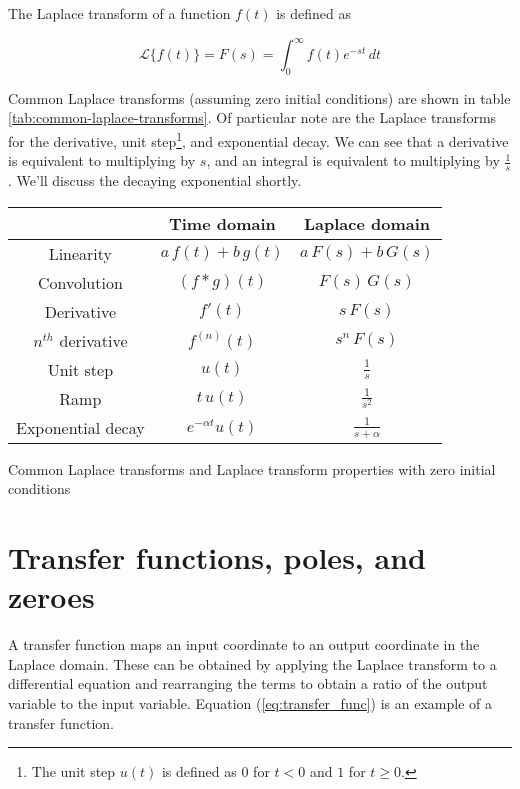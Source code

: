 The Laplace transform of a function $f(t)$ is defined as

\begin{equation*}
  \mathcal{L}\{f(t)\} = F(s) = \int_0^\infty f(t) e^{-st} \,dt
\end{equation*}

Common Laplace transforms (assuming zero initial conditions) are shown in table
\ref{tab:common-laplace-transforms}. Of particular note are the Laplace
transforms for the derivative, unit step\footnote{The unit step $u(t)$ is
defined as $0$ for $t < 0$ and $1$ for $t \ge 0$.}, and exponential decay. We
can see that a derivative is equivalent to multiplying by $s$, and an integral
is equivalent to multiplying by $\frac{1}{s}$. We'll discuss the decaying
exponential shortly.

\begin{booktable}
  \begin{tabular}{|ccc|}
    \hline
    \rowcolor{headingbg}
    & \textbf{Time domain} & \textbf{Laplace domain} \\
    \hline
    Linearity & $a\,f(t) + b\,g(t)$ & $a\,F(s) + b\,G(s)$ \\
    Convolution & $(f * g)(t)$ & $F(s) \,G(s)$ \\
    Derivative & $f'(t)$ & $s \,F(s)$ \\
    $n^{th}$ derivative & $f^{(n)}(t)$ & $s^n \,F(s)$ \\
    Unit step & $u(t)$ & $\frac{1}{s}$ \\
    Ramp & $t \,u(t)$ & $\frac{1}{s^2}$ \\
    Exponential decay & $e^{-\alpha t} u(t)$ & $\frac{1}{s + \alpha}$ \\
    \hline
  \end{tabular}
  \caption{Common Laplace transforms and Laplace transform properties with zero
    initial conditions}
  \label{tab:common-laplace-transforms}
\end{booktable}

\section{Transfer functions, poles, and zeroes}

A transfer function maps an input coordinate to an output coordinate in the
Laplace domain. These can be obtained by applying the Laplace transform to a
differential equation and rearranging the terms to obtain a ratio of the output
variable to the input variable. Equation (\ref{eq:transfer_func}) is an example
of a transfer function.

